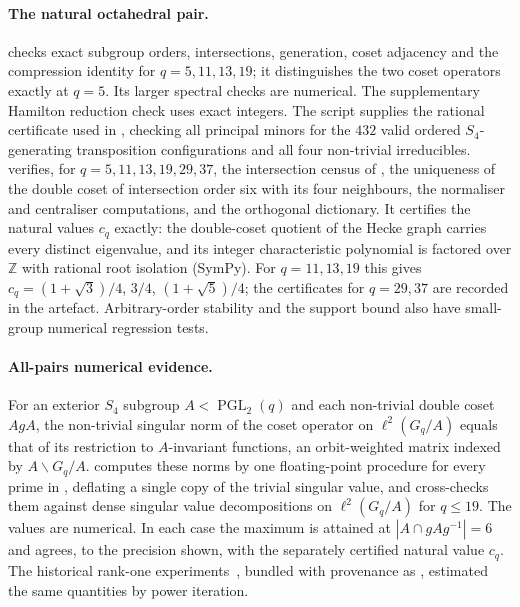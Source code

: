 \documentclass[11pt]{amsart}
\theoremstyle{definition}
\theoremstyle{remark}
\theoremstyle{plain}
\theoremstyle{plain}
\numberwithin{equation}{section}
\DeclareMathOperator{\PGL}{PGL}
\newcommand{\Z}{\mathbb{Z}}
\begin{document}
\paragraph{The natural octahedral pair.}
 checks exact subgroup orders, intersections,
generation, coset adjacency and the compression identity for $q=5,11,13,19$;
it distinguishes the two coset operators exactly at $q=5$. Its larger
spectral checks are numerical. The supplementary Hamilton reduction check
uses exact integers. The script 
supplies the rational certificate used in ,
checking all principal minors for the $432$ valid ordered
$S_4$-generating transposition configurations and all four non-trivial
irreducibles.
 verifies, for $q=5,11,13,19,29,37$, the
intersection census of , the uniqueness of the
double coset of intersection order six with its four neighbours, the
normaliser and centraliser computations, and the orthogonal dictionary.
It certifies the natural values $c_q$ exactly: the double-coset quotient
of the Hecke graph carries every distinct eigenvalue, and its integer
characteristic polynomial is factored over $\Z$ with rational root
isolation (SymPy). For $q=11,13,19$ this gives $c_q=(1+\sqrt3)/4$,
$3/4$, $(1+\sqrt5)/4$; the certificates for $q=29,37$ are recorded in the
artefact.
Arbitrary-order stability and the support bound
also have small-group numerical regression tests.

\paragraph{All-pairs numerical evidence.}
For an exterior $S_4$ subgroup $A<\PGL_2(q)$ and each non-trivial double
coset $AgA$, the non-trivial singular norm of the coset operator on
$\ell^2(G_q/A)$ equals that of its restriction to $A$-invariant
functions, an orbit-weighted matrix indexed by $A\backslash G_q/A$.
 computes these norms by one
floating-point procedure for every prime in ,
deflating a single copy of the trivial singular value, and cross-checks
them against dense singular value decompositions on $\ell^2(G_q/A)$ for
$q\le19$. The values are numerical. In each case the maximum is attained
at $|A\cap gAg^{-1}|=6$ and agrees, to the precision shown, with the
separately certified natural value $c_q$. The historical rank-one
experiments~\cite{ZermenoRankOneZenodo}, bundled with provenance as
, estimated the same
quantities by power iteration.
\end{document}
